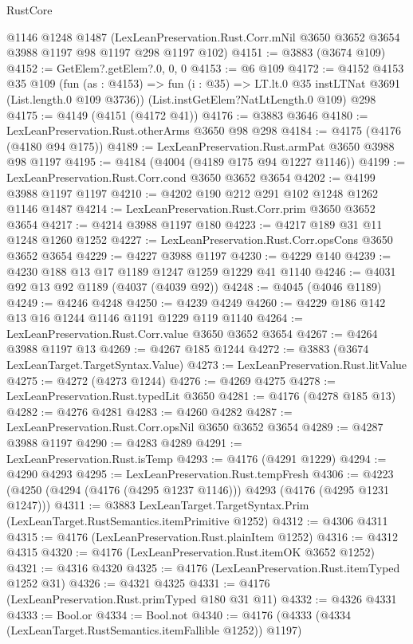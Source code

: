 \begin{lexlean}{RustCore}
\begin{coremodule}
    @1146
    @1248
    @1487
    (LexLeanPreservation.Rust.Corr.mNil @3650 @3652 @3654 @3988 @1197 @98 @1197 @298 @1197 @102)
@4151 := @3883 (@3674 @109)
@4152 := GetElem?.getElem?.{0, 0, 0}
@4153 := @6 @109
@4172 := @4152
    @4153
    @35
    @109
    (fun (as : @4153) =>
    fun (i : @35) => LT.lt.{0} @35 instLTNat @3691 (List.length.{0} @109 @3736))
    (List.instGetElem?NatLtLength.{0} @109)
    @298
@4175 := @4149 (@4151 (@4172 @41))
@4176 := @3883 @3646
@4180 := LexLeanPreservation.Rust.otherArms @3650 @98 @298
@4184 := @4175 (@4176 (@4180 @94 @175))
@4189 := LexLeanPreservation.Rust.armPat @3650 @3988 @98 @1197
@4195 := @4184 (@4004 (@4189 @175 @94 @1227 @1146))
@4199 := LexLeanPreservation.Rust.Corr.cond @3650 @3652 @3654
@4202 := @4199 @3988 @1197 @1197
@4210 := @4202 @190 @212 @291 @102 @1248 @1262 @1146 @1487
@4214 := LexLeanPreservation.Rust.Corr.prim @3650 @3652 @3654
@4217 := @4214 @3988 @1197 @180
@4223 := @4217 @189 @31 @11 @1248 @1260 @1252
@4227 := LexLeanPreservation.Rust.Corr.opsCons @3650 @3652 @3654
@4229 := @4227 @3988 @1197
@4230 := @4229 @140
@4239 := @4230 @188 @13 @17 @1189 @1247 @1259 @1229 @41 @1140
@4246 := @4031 @92 @13 @92 @1189 (@4037 (@4039 @92))
@4248 := @4045 (@4046 @1189)
@4249 := @4246 @4248
@4250 := @4239 @4249
@4260 := @4229 @186 @142 @13 @16 @1244 @1146 @1191 @1229 @119 @1140
@4264 := LexLeanPreservation.Rust.Corr.value @3650 @3652 @3654
@4267 := @4264 @3988 @1197 @13
@4269 := @4267 @185 @1244
@4272 := @3883 (@3674 LexLeanTarget.TargetSyntax.Value)
@4273 := LexLeanPreservation.Rust.litValue
@4275 := @4272 (@4273 @1244)
@4276 := @4269 @4275
@4278 := LexLeanPreservation.Rust.typedLit @3650
@4281 := @4176 (@4278 @185 @13)
@4282 := @4276 @4281
@4283 := @4260 @4282
@4287 := LexLeanPreservation.Rust.Corr.opsNil @3650 @3652 @3654
@4289 := @4287 @3988 @1197
@4290 := @4283 @4289
@4291 := LexLeanPreservation.Rust.isTemp
@4293 := @4176 (@4291 @1229)
@4294 := @4290 @4293
@4295 := LexLeanPreservation.Rust.tempFresh
@4306 := @4223 (@4250 (@4294 (@4176 (@4295 @1237 @1146))) @4293 (@4176 (@4295 @1231 @1247)))
@4311 := @3883 LexLeanTarget.TargetSyntax.Prim (LexLeanTarget.RustSemantics.itemPrimitive @1252)
@4312 := @4306 @4311
@4315 := @4176 (LexLeanPreservation.Rust.plainItem @1252)
@4316 := @4312 @4315
@4320 := @4176 (LexLeanPreservation.Rust.itemOK @3652 @1252)
@4321 := @4316 @4320
@4325 := @4176 (LexLeanPreservation.Rust.itemTyped @1252 @31)
@4326 := @4321 @4325
@4331 := @4176 (LexLeanPreservation.Rust.primTyped @180 @31 @11)
@4332 := @4326 @4331
@4333 := Bool.or
@4334 := Bool.not
@4340 := @4176 (@4333 (@4334 (LexLeanTarget.RustSemantics.itemFallible @1252)) @1197)

\end{coremodule}
\end{lexlean}

